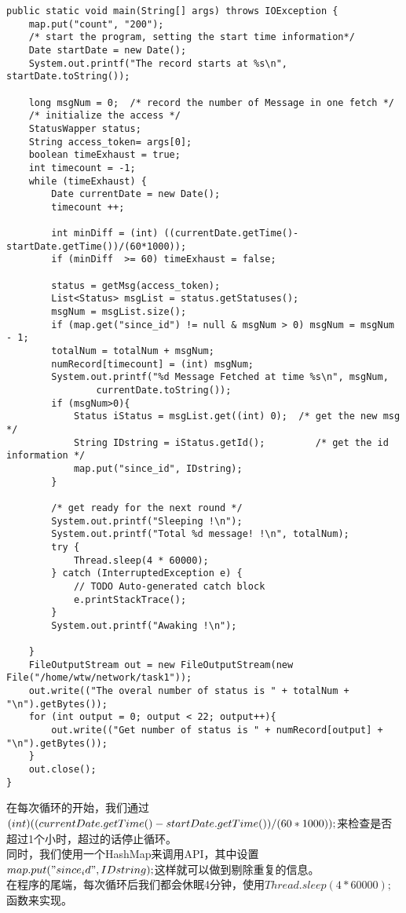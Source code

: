 \documentclass{article}
\begin{document}
\begin{lstlisting}
public static void main(String[] args) throws IOException {
	map.put("count", "200");
	/* start the program, setting the start time information*/
	Date startDate = new Date();
	System.out.printf("The record starts at %s\n", startDate.toString());

	long msgNum = 0;  /* record the number of Message in one fetch */
	/* initialize the access */
	StatusWapper status;
	String access_token= args[0];
	boolean timeExhaust = true;
	int timecount = -1;
	while (timeExhaust) {
		Date currentDate = new Date();
		timecount ++;
		
		int minDiff = (int) ((currentDate.getTime()-startDate.getTime())/(60*1000));
		if (minDiff  >= 60) timeExhaust = false;
			
		status = getMsg(access_token);
		List<Status> msgList = status.getStatuses();
		msgNum = msgList.size();
		if (map.get("since_id") != null & msgNum > 0) msgNum = msgNum - 1;
		totalNum = totalNum + msgNum;	
		numRecord[timecount] = (int) msgNum;
		System.out.printf("%d Message Fetched at time %s\n", msgNum,
				currentDate.toString());
		if (msgNum>0){
			Status iStatus = msgList.get((int) 0);  /* get the new msg */
			String IDstring = iStatus.getId();		   /* get the id information */
			map.put("since_id", IDstring);
		}

		/* get ready for the next round */			
		System.out.printf("Sleeping !\n");
		System.out.printf("Total %d message! !\n", totalNum);
	    try {
			Thread.sleep(4 * 60000);
		} catch (InterruptedException e) {
			// TODO Auto-generated catch block
			e.printStackTrace();
		}
		System.out.printf("Awaking !\n");
	    
	}
	FileOutputStream out = new FileOutputStream(new File("/home/wtw/network/task1"));   
	out.write(("The overal number of status is " + totalNum + "\n").getBytes());
	for (int output = 0; output < 22; output++){
		out.write(("Get number of status is " + numRecord[output] + "\n").getBytes());
	}
	out.close();
}
\end{lstlisting}
在每次循环的开始，我们通过\((int) ((currentDate.getTime()-startDate.getTime\\())/(60*1000));\)来检查是否超过1个小时，超过的话停止循环。\\
同时，我们使用一个HashMap来调用API，其中设置\(map.put("since_id", IDstr\\ing);\)这样就可以做到剔除重复的信息。\\
在程序的尾端，每次循环后我们都会休眠4分钟，使用\(Thread.sleep(4 * 60000);\)函数来实现。
\end{document}
